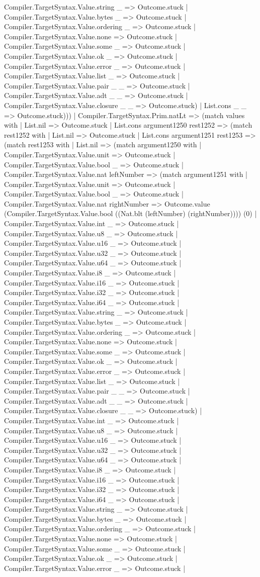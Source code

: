 \documentclass[11pt]{article}
\begin{document}
Compiler.TargetSyntax.Value.string \_ => Outcome.stuck | Compiler.TargetSyntax.Value.bytes \_ => Outcome.stuck | Compiler.TargetSyntax.Value.ordering \_ => Outcome.stuck | Compiler.TargetSyntax.Value.none => Outcome.stuck | Compiler.TargetSyntax.Value.some \_ => Outcome.stuck | Compiler.TargetSyntax.Value.ok \_ => Outcome.stuck | Compiler.TargetSyntax.Value.error \_ => Outcome.stuck | Compiler.TargetSyntax.Value.list \_ => Outcome.stuck | Compiler.TargetSyntax.Value.pair \_ \_ => Outcome.stuck | Compiler.TargetSyntax.Value.adt \_ \_ => Outcome.stuck | Compiler.TargetSyntax.Value.closure \_ \_ => Outcome.stuck) | List.cons \_ \_ => Outcome.stuck))) | Compiler.TargetSyntax.Prim.natLt => (match values with | List.nil => Outcome.stuck | List.cons argument1250 rest1252 => (match rest1252 with | List.nil => Outcome.stuck | List.cons argument1251 rest1253 => (match rest1253 with | List.nil => (match argument1250 with | Compiler.TargetSyntax.Value.unit => Outcome.stuck | Compiler.TargetSyntax.Value.bool \_ => Outcome.stuck | Compiler.TargetSyntax.Value.nat leftNumber => (match argument1251 with | Compiler.TargetSyntax.Value.unit => Outcome.stuck | Compiler.TargetSyntax.Value.bool \_ => Outcome.stuck | Compiler.TargetSyntax.Value.nat rightNumber => Outcome.value (Compiler.TargetSyntax.Value.bool ((Nat.blt (leftNumber) (rightNumber)))) (0) | Compiler.TargetSyntax.Value.int \_ => Outcome.stuck | Compiler.TargetSyntax.Value.u8 \_ => Outcome.stuck | Compiler.TargetSyntax.Value.u16 \_ => Outcome.stuck | Compiler.TargetSyntax.Value.u32 \_ => Outcome.stuck | Compiler.TargetSyntax.Value.u64 \_ => Outcome.stuck | Compiler.TargetSyntax.Value.i8 \_ => Outcome.stuck | Compiler.TargetSyntax.Value.i16 \_ => Outcome.stuck | Compiler.TargetSyntax.Value.i32 \_ => Outcome.stuck | Compiler.TargetSyntax.Value.i64 \_ => Outcome.stuck | Compiler.TargetSyntax.Value.string \_ => Outcome.stuck | Compiler.TargetSyntax.Value.bytes \_ => Outcome.stuck | Compiler.TargetSyntax.Value.ordering \_ => Outcome.stuck | Compiler.TargetSyntax.Value.none => Outcome.stuck | Compiler.TargetSyntax.Value.some \_ => Outcome.stuck | Compiler.TargetSyntax.Value.ok \_ => Outcome.stuck | Compiler.TargetSyntax.Value.error \_ => Outcome.stuck | Compiler.TargetSyntax.Value.list \_ => Outcome.stuck | Compiler.TargetSyntax.Value.pair \_ \_ => Outcome.stuck | Compiler.TargetSyntax.Value.adt \_ \_ => Outcome.stuck | Compiler.TargetSyntax.Value.closure \_ \_ => Outcome.stuck) | Compiler.TargetSyntax.Value.int \_ => Outcome.stuck | Compiler.TargetSyntax.Value.u8 \_ => Outcome.stuck | Compiler.TargetSyntax.Value.u16 \_ => Outcome.stuck | Compiler.TargetSyntax.Value.u32 \_ => Outcome.stuck | Compiler.TargetSyntax.Value.u64 \_ => Outcome.stuck | Compiler.TargetSyntax.Value.i8 \_ => Outcome.stuck | Compiler.TargetSyntax.Value.i16 \_ => Outcome.stuck | Compiler.TargetSyntax.Value.i32 \_ => Outcome.stuck | Compiler.TargetSyntax.Value.i64 \_ => Outcome.stuck | Compiler.TargetSyntax.Value.string \_ => Outcome.stuck | Compiler.TargetSyntax.Value.bytes \_ => Outcome.stuck | Compiler.TargetSyntax.Value.ordering \_ => Outcome.stuck | Compiler.TargetSyntax.Value.none => Outcome.stuck | Compiler.TargetSyntax.Value.some \_ => Outcome.stuck | Compiler.TargetSyntax.Value.ok \_ => Outcome.stuck | Compiler.TargetSyntax.Value.error \_ => Outcome.stuck | 
\end{document}
